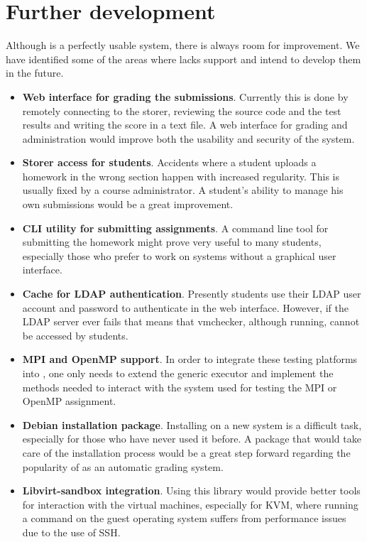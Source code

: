 \chapter{Further development}
\label{chapter:virt-devel}

Although \project is a perfectly usable system, there is always room for improvement.
We have identified some of the areas where \project lacks support and intend to
develop them in the future.

\begin{itemize}
\item {\bf Web interface for grading the submissions}. Currently this is done by
remotely connecting to the storer, reviewing the source code and the test results
and writing the score in a text file. A web interface for grading and administration
would improve both the usability and security of the system.
\item {\bf Storer access for students}. Accidents where a student uploads a
homework in the wrong section happen with increased regularity. This is usually
fixed by a course administrator. A student's ability to manage his own submissions
would be a great improvement.
\item {\bf CLI utility for submitting assignments}. A command line tool for 
submitting the homework might prove very useful to many students, especially
those who prefer to work on systems without a graphical user interface.
\item {\bf Cache for LDAP authentication}. Presently students use their
LDAP user account and password to authenticate in the web interface. However,
if the LDAP server ever fails that means that vmchecker, although running,
cannot be accessed by students.
\item {\bf MPI and OpenMP support}. In order to integrate these testing platforms
into \project, one only needs to extend the generic executor and implement
the methods needed to interact with the system used for testing the MPI or OpenMP
assignment.
\item {\bf Debian installation package}. Installing \project on a new system
is a difficult task, especially for those who have never used it before. 
A package that would take care of the installation process would be a great 
step forward regarding the popularity of \project as an automatic grading system.
\item {\bf Libvirt-sandbox integration}. Using this library would provide
better tools for interaction with the virtual machines, especially for KVM,
where running a command on the guest operating system suffers from performance
issues due to the use of SSH.
\end{itemize}
